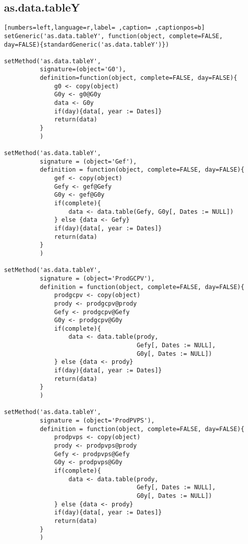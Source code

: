 \subsection{as.data.tableY}
\label{sec:org4fd981e}
\begin{lstlisting}[numbers=left,language=r,label= ,caption= ,captionpos=b]
setGeneric('as.data.tableY', function(object, complete=FALSE, day=FALSE){standardGeneric('as.data.tableY')})

setMethod('as.data.tableY',
          signature=(object='G0'),
          definition=function(object, complete=FALSE, day=FALSE){
              g0 <- copy(object)
              G0y <- g0@G0y
              data <- G0y
              if(day){data[, year := Dates]}
              return(data)
          }
          )

setMethod('as.data.tableY',
          signature = (object='Gef'),
          definition = function(object, complete=FALSE, day=FALSE){
              gef <- copy(object)
              Gefy <- gef@Gefy
              G0y <- gef@G0y
              if(complete){
                  data <- data.table(Gefy, G0y[, Dates := NULL])
              } else {data <- Gefy}
              if(day){data[, year := Dates]}
              return(data)
          }
          )

setMethod('as.data.tableY',
          signature = (object='ProdGCPV'),
          definition = function(object, complete=FALSE, day=FALSE){
              prodgcpv <- copy(object)
              prody <- prodgcpv@prody
              Gefy <- prodgcpv@Gefy
              G0y <- prodgcpv@G0y
              if(complete){
                  data <- data.table(prody,
                                     Gefy[, Dates := NULL],
                                     G0y[, Dates := NULL])       
              } else {data <- prody}
              if(day){data[, year := Dates]}
              return(data)
          }
          )

setMethod('as.data.tableY',
          signature = (object='ProdPVPS'),
          definition = function(object, complete=FALSE, day=FALSE){
              prodpvps <- copy(object)
              prody <- prodpvps@prody
              Gefy <- prodpvps@Gefy
              G0y <- prodpvps@G0y
              if(complete){
                  data <- data.table(prody,
                                     Gefy[, Dates := NULL],
                                     G0y[, Dates := NULL])       
              } else {data <- prody}
              if(day){data[, year := Dates]}
              return(data)
          }
          )
\end{lstlisting}
